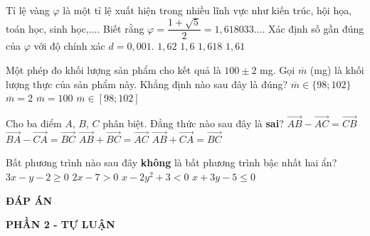 \begin{ex}%
	Tỉ lệ vàng $\varphi$ là một tỉ lệ xuất hiện trong nhiều lĩnh vực như kiến trúc, hội họa, toán học, sinh học,$\ldots$. Biết rằng $\varphi=\dfrac{1+\sqrt{5}}{2}=1{,}618033\ldots$. Xác định số gần đúng của $\varphi$ với độ chính xác $d=0{,}001$.
	\choice
	{$1{,}62$}
	{$1{,}6$}
	{\True $1{,}618$}
	{$1{,}61$}
\end{ex}
\begin{ex}%
Một phép đo khối lượng sản phẩm cho kết quả là $100\pm 2$ mg. Gọi $\overline{m}$ (mg) là khối lượng thực của sản phẩm này. Khẳng định nào sau đây là đúng?
	\choice
	{$\overline{m}\in\{98;102\}$}
	{$\overline{m}=2$}
	{$\overline{m}=100$}
	{\True $\overline{m}\in\left[98;102\right]$}
\end{ex}
\begin{ex}%
	Cho ba điểm $A$, $B$, $C$ phân biệt. Đẳng thức nào sau đây là \textbf{sai}?
	\choice
	{$\overrightarrow{AB}-\overrightarrow{AC}=\overrightarrow{CB}$}
	{$\overrightarrow{BA}-\overrightarrow{CA}=\overrightarrow{BC}$}
	{$\overrightarrow{AB}+\overrightarrow{BC}=\overrightarrow{AC}$}
	{\True $\overrightarrow{AB}+\overrightarrow{CA}=\overrightarrow{BC}$}
\end{ex}
\begin{ex}%
	Bất phương trình nào sau đây \textbf{không} là bất phương trình bậc nhất hai ẩn?
	\choice
	{$3x-y-2\ge 0$}
	{$2x-7>0$}
	{\True $x-2y^2+3<0$}
	{$x+3y-5\le 0$}
\end{ex}
\begin{center}
	\textbf{ĐÁP ÁN}
\end{center}
\begin{center}
	\textbf{PHẦN 2 - TỰ LUẬN}
\end{center}

